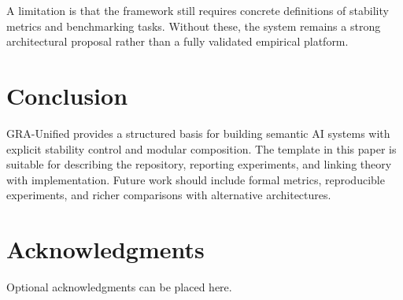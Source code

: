 \documentclass[11pt,a4paper]{article}
\begin{document}
A limitation is that the framework still requires concrete definitions of stability metrics and benchmarking tasks. Without these, the system remains a strong architectural proposal rather than a fully validated empirical platform.

\section{Conclusion}
GRA-Unified provides a structured basis for building semantic AI systems with explicit stability control and modular composition. The template in this paper is suitable for describing the repository, reporting experiments, and linking theory with implementation. Future work should include formal metrics, reproducible experiments, and richer comparisons with alternative architectures.

\section*{Acknowledgments}
Optional acknowledgments can be placed here.


\end{document}
